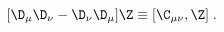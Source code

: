 \begin{equation}
\label{e5:35}
[\D_{\mu}\D_{\nu}-\D_{\nu}\D_{\mu}]\Z \equiv [\C_{\mu \nu},\Z] \; .
\end{equation} 
